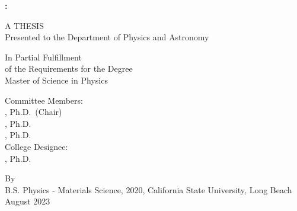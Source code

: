 \clearpage
\singlespacing
\begin{titlepage}
\begin{center}
  
      \MakeUppercase{ \textbf{ \ttitle: \subttitle } }
      \vfill
        
A THESIS \\  \bigskip
Presented to the Department of Physics and Astronomy \\ \bigskip
\univname
        
        \vfill
        
        In Partial Fulfillment\\
        \bigskip
        of the Requirements for the Degree\\
        \bigskip
        Master of Science in Physics\\
        
        \vfill
        
        Committee Members:\\
        \bigskip
        \advisorname, Ph.D.~(Chair)\\
        \memberonename, Ph.D.\\
        \membertwoname, Ph.D.\\
        \bigskip
        College Designee:\\
        \bigskip
        \deptchairname, Ph.D.
        
        \vfill
        
        By \authorname \\
        \bigskip
        B.S. Physics - Materials Science, 2020, California State University, Long Beach\\
        \bigskip
		August 2023
		
    \end{center}
\end{titlepage}

